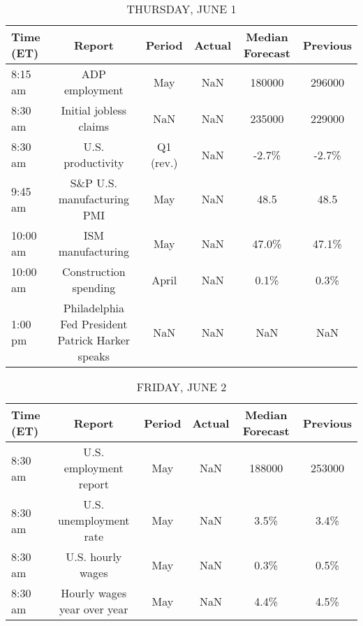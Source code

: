 \documentclass{article}%
\begin{document}
%


\begin{table}[htbp]%
\caption{THURSDAY, JUNE 1}%
\centering%
\begin{adjustbox}{width=1\textwidth}%
\begin{tabular}{lccccc}
\toprule
Time (ET) &                                           Report &    Period & Actual & Median Forecast & Previous \\
\midrule
  8:15 am &                                   ADP employment &       May &    NaN &          180000 &   296000 \\
  8:30 am &                           Initial jobless claims &       NaN &    NaN &          235000 &   229000 \\
  8:30 am &                                U.S. productivity & Q1 (rev.) &    NaN &           -2.7\% &    -2.7\% \\
  9:45 am &                       S\&P U.S. manufacturing PMI &       May &    NaN &            48.5 &     48.5 \\
 10:00 am &                                ISM manufacturing &       May &    NaN &           47.0\% &    47.1\% \\
 10:00 am &                            Construction spending &     April &    NaN &            0.1\% &     0.3\% \\
  1:00 pm & Philadelphia Fed President Patrick Harker speaks &       NaN &    NaN &             NaN &      NaN \\
\bottomrule
\end{tabular}
%
\end{adjustbox}%
\end{table}

%


\begin{table}[htbp]%
\caption{FRIDAY, JUNE 2}%
\centering%
\begin{adjustbox}{width=1\textwidth}%
\begin{tabular}{lccccc}
\toprule
Time (ET) &                      Report & Period & Actual & Median Forecast & Previous \\
\midrule
  8:30 am &      U.S. employment report &    May &    NaN &          188000 &   253000 \\
  8:30 am &      U.S. unemployment rate &    May &    NaN &            3.5\% &     3.4\% \\
  8:30 am &           U.S. hourly wages &    May &    NaN &            0.3\% &     0.5\% \\
  8:30 am & Hourly wages year over year &    May &    NaN &            4.4\% &     4.5\% \\
\bottomrule
\end{tabular}
%
\end{adjustbox}%
\end{table}
\end{document}
